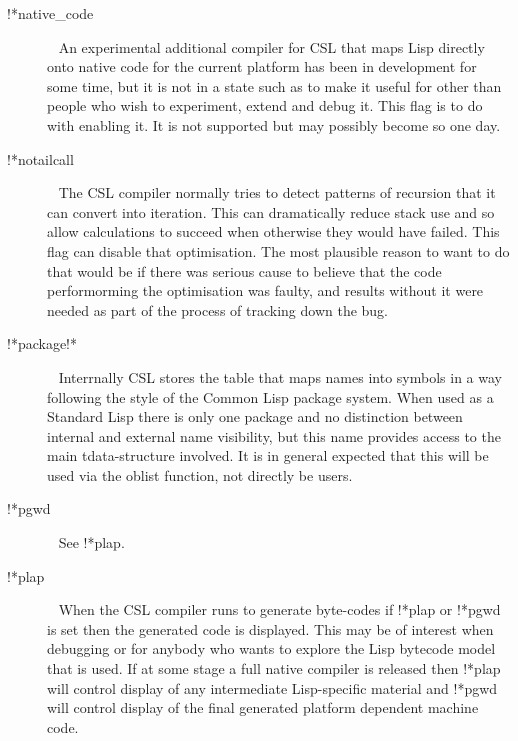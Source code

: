 \documentclass[a4paper,11pt]{article}
\begin{document}
\begin{description}
\item [{\ttfamily !*native\_code}]  ~\newline
An experimental additional compiler for CSL that maps Lisp directly onto
native code for the current platform has been in development for some time,
but it is not in a state such as to make it useful for other than
people who wish to experiment, extend and debug it. This flag is to do
with enabling it. It is not supported but may possibly become so one day.

\item [{\ttfamily !*notailcall}]  ~\newline
The CSL compiler normally tries to detect patterns of recursion that it
can convert into iteration. This can dramatically reduce stack use and
so allow calculations to succeed when otherwise they would have failed.
This flag can disable that optimisation. The most plausible reason to
want to do that would be if there was serious cause to believe that the
code performorming the optimisation was faulty, and results without it were
needed as part of the process of tracking down the bug.

\item [{\ttfamily !*package!*}]  ~\newline
Interrnally CSL stores the table that maps names into symbols in a way
following the style of the Common Lisp package system. When used as
a Standard Lisp there is only one package and no distinction between
internal and external name visibility, but this name provides access to
the main tdata-structure involved. It is in general expected that this
will be used via the {\ttfamily oblist} function, not directly be users.

\item [{\ttfamily !*pgwd}]  ~\newline
See {\ttfamily !*plap}.

\item [{\ttfamily !*plap}]  ~\newline
When the CSL compiler runs to generate byte-codes if {\ttfamily !*plap} or
{\ttfamily !*pgwd} is set then the generated code is displayed. This may
be of interest when debugging or for anybody who wants to explore the
Lisp bytecode model that is used. If at some stage a full native compiler
is released then {\ttfamily !*plap} will control display of any intermediate
Lisp-specific material and {\ttfamily !*pgwd} will control display of the
final generated platform dependent machine code.


\end{description}
\end{document}
